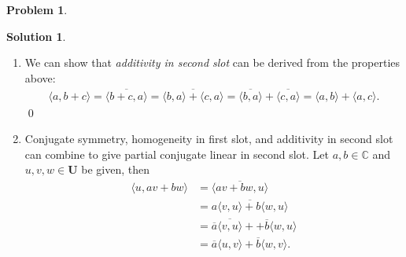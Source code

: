 \documentclass{book}
\theoremstyle{definition}
\newtheorem*{prob*}{Problem}
\newtheorem*{sln*}{Solution}
\newcommand{\R}{\mathbb{R}}
\newcommand{\U}{\mathbf{U}}
\newcommand{\la}{\langle}
\newcommand{\ra}{\rangle}
\begin{document}
\begin{prob*}
\begin{enumerate}
\begin{sln*}
\begin{enumerate}
\begin{enumerate}
					\item The last step is to show that $\la \lambda u,v\ra = \lambda \la u,v \ra$ still holds when $\lambda$ is any real number. Once this is shown, showing $\la \lambda u,v \ra = \lambda\la u,v \ra$ will be much simpler.\\
					\textbf{But this is where I'm stuck. I'm hoping to somehow express $\lambda$, a real number, in terms of rational numbers, but I don't know how.}
					
					\item Assume that we have successfully completed the previous part, then let $\lambda = a + ib$ where $a,b\in \R$, then
					\begin{align*}
					\la \lambda u ,v\ra &= \la (a+ib)u,v \ra\\ &= \la au,v\ra + \la ibu,v \ra\\ &= a\la u,v \ra + b\la iu,v\ra\\ &= a\la u,v \ra + ib\la u,v \ra \\&= (a+ib)\la u,v \ra\\&= \lambda\la u,v \ra.
					\end{align*}
					\qed
				\end{enumerate}
				
				
				
				
				\item We can show that \textit{additivity in second slot} can be derived from the properties above:
				\begin{align*}
				\la a,b+c \ra = \overline{\la b+c,a  \ra} = \overline{\la b,a \ra + \la c,a \ra} = \overline{\la b,a \ra} + \overline{\la c,a\ra} =\la a,b\ra + \la a,c \ra.
				\end{align*}\qed
				
				\item Conjugate symmetry, homogeneity in first slot, and additivity in second slot can combine to give partial conjugate linear in second slot. Let $a , b \in \mathbb{C}$ and $u,v,w\in \U$ be given, then
				\begin{align*}
				\la u, av + bw \ra &= \overline{\la av+bw, u \ra}\\
				&= \overline{a\la v,u \ra + b\la w,u \ra}\\
				&= \overline{a}\overline{\la v,u \ra} + + \overline{b}\la w,u \ra\\
				&= \overline{a}\la u,v \ra + \overline{b}\la w,v \ra.
				\end{align*}
				
				
			\end{enumerate}
			

\end{sln*}
\end{enumerate}
\end{prob*}
\end{document}
